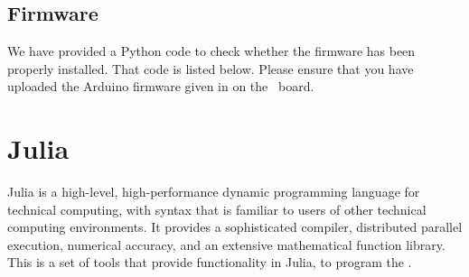 



\subsection{Firmware}
\lstset{style=mystyle}
\label{sec:test-firmware-python}
We have provided a Python code to check whether the firmware has been
properly installed. That code is listed below. 
Please ensure that you have uploaded the Arduino firmware given in  on the \arduino\ board.


\begin{pycode}
      \label{py:test-firmware}
      
\end{pycode}








\section{Julia}
\label{sec:julia-start}
Julia is a high-level, high-performance dynamic programming language for
technical computing, with syntax that is familiar to users of other technical
computing environments. It provides a sophisticated compiler, distributed
parallel execution, numerical accuracy, and an extensive mathematical function
library. This is a set of tools that provide functionality in Julia, to program the
\arduino. 


